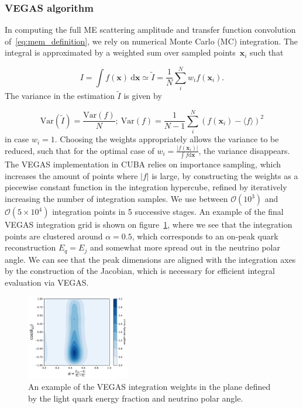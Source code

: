 \subsubsection{VEGAS algorithm}
In computing the full ME scattering amplitude and transfer function convolution of~\cref{eq:mem_definition}, we rely on numerical Monte Carlo (MC) integration. The integral is approximated by a weighted sum over sampled points~$\mathbf{x}_i$ such that

\begin{equation}
I = \int f(\mathbf{x})\ \mathrm{d}\mathbf{x} \simeq \tilde{I} = \frac{1}{N} \sum_{i}^N w_i f(\mathbf{x}_i).
\end{equation}
The variance in the estimation $\tilde{I}$ is given by

$$\mathrm{Var}(\tilde{I}) = \frac{\mathrm{Var}(f)}{N};\ \mathrm{Var}(f) = \frac{1}{N-1} \sum_i^N(f(\mathbf{x}_i) - \langle f \rangle)^2$$
in case $w_i = 1$. Choosing the weights appropriately allows the variance to be reduced, such that for the optimal case of $w_i = \frac{|f(\mathbf{x}_i)|}{\int f \mathrm{d}\mathbf{x}}$, the variance disappears. The VEGAS implementation in CUBA relies on importance sampling, which increases the amount of points where $|f|$ is large, by constructing the weights as a piecewise constant function in the integration hypercube, refined by iteratively increasing the number of integration samples. We use between $\mathcal{O}(10^3)$ and $\mathcal{O}(5 \times 10^4)$ integration points in 5 successive stages. An example of the final VEGAS integration grid is shown on figure~\cref{fig:vegas_grid}, where we see that the integration points are clustered around $\alpha=0.5$, which corresponds to an on-peak quark reconstruction $E_q = E_j$ and somewhat more spread out in the neutrino polar angle. We can see that the peak dimensions are aligned with the integration axes by the construction of the Jacobian, which is necessary for efficient integral evaluation via VEGAS.

\begin{figure}[ht]
\begin{centering}
\includegraphics[width = 0.4\textwidth]{figures/mem/vegas_grid.pdf}
\caption[VEGAS grid example]{An example of the VEGAS integration weights in the plane defined by the light quark energy fraction and neutrino polar angle.}
\label{fig:vegas_grid}
\end{centering}
\end{figure}

